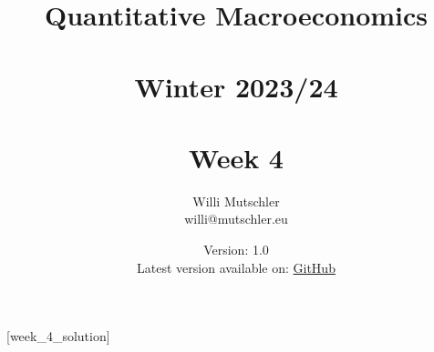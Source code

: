 
\newif\ifDisplaySolutions%


\title{Quantitative Macroeconomics\\~\\Winter 2023/24\\~\\Week 4}
\author{Willi Mutschler\\willi@mutschler.eu}
\date{Version: 1.0\\Latest version available on: \href{https://github.com/wmutschl/Quantitative-Macroeconomics/releases/latest/download/week_4.pdf}{GitHub}}
\maketitle\thispagestyle{empty}

\newpage
{}[week_4_solution]
\tableofcontents\thispagestyle{empty}\newpage

\setcounter{page}{1}
\newpage
\newpage
\newpage
\printbibliography
\newpage

\ifDisplaySolutions
\newpage
\appendix
\section{Solutions}

\fi
